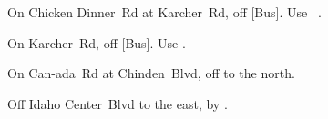 
\begin{LocationList}

On Chicken Dinner~Rd at  Karcher~Rd, off [Bus].
Use~ .

On  Karcher~Rd, off [Bus].
Use  .

On Can-ada~Rd at   Chinden~Blvd, off   to the north.

Off Idaho Center~Blvd to the east, by  .

\end{LocationList}

